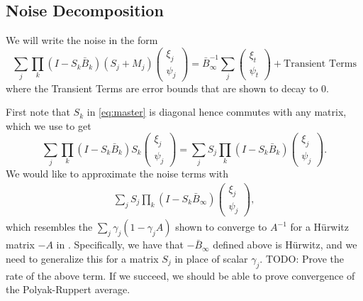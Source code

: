\subsection{Noise Decomposition}
We will write the noise in the form
\begin{equation}
    \sum_j \prod_k \left(I - S_k \bar{B}_k\right) \left(S_j + M_j\right) \begin{pmatrix}
        \xi_j \\ \psi_j 
    \end{pmatrix} = 
    \bar{B}_\infty^{-1} \sum_j \begin{pmatrix}
        \xi_t \\ \psi_t
    \end{pmatrix}
    + \text{Transient Terms}
\end{equation}
where the Transient Terms are error bounds that are shown to decay to 0.


First note that $S_k$ in \eqref{eq:master} is diagonal hence commutes with any matrix, which we use to get
\begin{equation}
    \sum_j \prod_k (I - S_k \bar{B}_k) S_k \begin{pmatrix}
        \xi_j \\ \psi_j 
    \end{pmatrix}
    = \sum_j S_j \prod_k (I - S_k \bar{B}_k) \begin{pmatrix}
        \xi_j \\ \psi_j 
    \end{pmatrix} .
\end{equation}
We would like to approximate the noise terms with 
\begin{align*}
    \sum_j S_j \prod_k (I - S_k \bar{B}_\infty) \begin{pmatrix}
        \xi_j \\ \psi_j 
    \end{pmatrix} , 
\end{align*}
which resembles the $\sum_j \gamma_j (1 - \gamma_j A)$ shown to converge to $A^{-1}$ for a H\"{u}rwitz matrix $-A$ in \citep{konda2004convergence}.
Specifically, we have that $-\bar{B}_\infty$ defined above is H\"{u}rwitz, and we need to generalize this for a matrix $S_j$ in place of scalar $\gamma_j$.
{\color{red}TODO: Prove the rate of the above term.
If we succeed, we should be able to prove convergence of the Polyak-Ruppert average.
}


